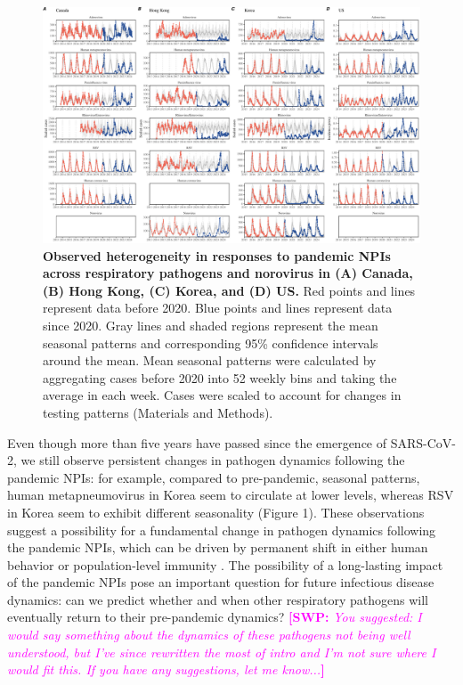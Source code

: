 \documentclass[12pt]{article}
\newcommand{\comment}{\showcomment}
\newcommand{\showcomment}[3]{\textcolor{#1}{\textbf{[#2: }\textsl{#3}\textbf{]}}}
\newcommand{\swp}[1]{\comment{magenta}{SWP}{#1}}
\begin{document}
\begin{figure}[!th]
\includegraphics[width=\textwidth]{../figure1/figure1.pdf}
\caption{
\textbf{Observed heterogeneity in responses to pandemic NPIs across respiratory pathogens and norovirus in (A) Canada, (B) Hong Kong, (C) Korea, and (D) US.}
Red points and lines represent data before 2020.
Blue points and lines represent data since 2020.
Gray lines and shaded regions represent the mean seasonal patterns and corresponding 95\% confidence intervals around the mean.
Mean seasonal patterns were calculated by aggregating cases before 2020 into 52 weekly bins and taking the average in each week.
Cases were scaled to account for changes in testing patterns (Materials and Methods).
}
\end{figure} 

Even though more than five years have passed since the emergence of SARS-CoV-2, we still observe persistent changes in pathogen dynamics following the pandemic NPIs: 
for example, compared to pre-pandemic, seasonal patterns, human metapneumovirus in Korea seem to circulate at lower levels, whereas RSV in Korea seem to exhibit different seasonality (Figure 1).
These observations suggest a possibility for a fundamental change in pathogen dynamics following the pandemic NPIs, which can be driven by permanent shift in either human behavior or population-level immunity \citep{kissler2020projecting,baker2022long}.
The possibility of a long-lasting impact of the pandemic NPIs pose an important question for future infectious disease dynamics: can we predict whether and when other respiratory pathogens will eventually return to their pre-pandemic dynamics?
\swp{You suggested: I would say something about the dynamics of these pathogens not being well understood, but I've since rewritten the most of intro and I'm not sure where I would fit this. If you have any suggestions, let me know...}
\end{document}
